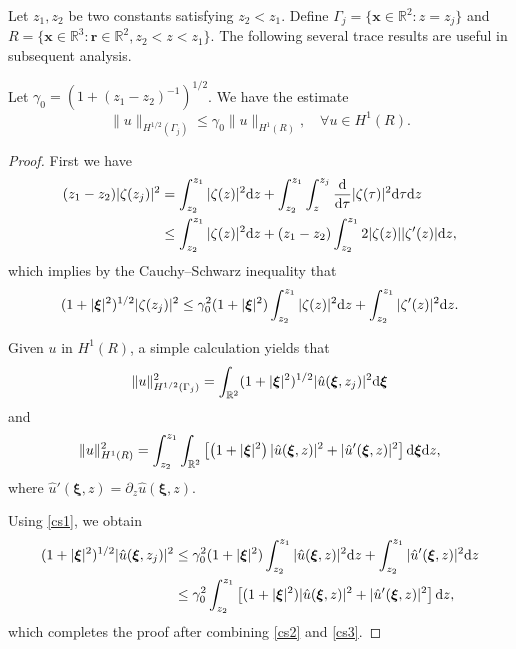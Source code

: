 \documentclass[final,leqno]{siamltex}
\begin{document}
Let $z_1, z_2$ be two constants satisfying $z_2<z_1$. Define
$\Gamma_j=\{\boldsymbol x\in\mathbb R^2: z=z_j\}$ and $R=\{\boldsymbol
x\in\mathbb{R}^3: \boldsymbol r\in\mathbb R^2, z_2<z<z_1\}$. The following
several trace results are useful in subsequent analysis.

\begin{lemma}\label{tr}
Let $\gamma_0=(1+(z_1 -z_2)^{-1})^{1/2}$. We have the estimate
\[
\|u\|_{H^{1/2}(\Gamma_j)}\leq \gamma_0 \| u\|_{H^1(R)},\quad\forall u\in
H^1(R).
\]
\end{lemma}

\begin{proof}
First we have
\begin{align*}
(z_1 -z_2)|\zeta(z_j)|^2&=\int_{z_2}^{z_1}|\zeta(z)|^2
{\rm d}z+\int_{z_2}^{z_1}\int_z^{z_j}\frac{\rm d}{{\rm d}\tau}|\zeta(\tau)|^2
{\rm d}\tau{\rm d}z\\
&\leq\int_{z_2}^{z_1}|\zeta(z)|^2{\rm
d}z+(z_1 -z_2)\int_{z_2}^{z_1}2|\zeta(z)||\zeta'(z)|{\rm d}z,
\end{align*}
which implies by the Cauchy--Schwarz inequality that
\begin{equation}\label{cs1}
(1+|\boldsymbol\xi|^2)^{1/2}|\zeta(z_j)|^2\leq \gamma_0^2
(1+|\boldsymbol\xi|^2)\int_{z_2}^{z_1}|\zeta(z)|^2
{\rm d}z+\int_{z_2}^{z_1}|\zeta'(z)|^2 {\rm d}z.
\end{equation}

Given $u$ in $H^1(R)$, a simple calculation yields that
\begin{equation}\label{cs2}
\|u\|^2_{H^{1/2}(\Gamma_j)}=\int_{\mathbb{R}^2}(1+|\boldsymbol\xi|^2)^{1/2}
|\hat{u} (\boldsymbol\xi, z_j)|^2 {\rm d}\boldsymbol\xi
\end{equation}
and
\begin{equation}\label{cs3}
\|u\|^2_{H^1(R)}=\int_{z_2}^{z_1}\int_{\mathbb{R}^2}\left[
\left(1+|\boldsymbol\xi|^2\right)|\hat{u}(\boldsymbol\xi,
z)|^2+|\hat{u}'(\boldsymbol\xi, z)|^2\right] {\rm d}\boldsymbol\xi {\rm d}z,
\end{equation}
where $\hat{u}'(\boldsymbol\xi, z)=\partial_z \hat{u}(\boldsymbol\xi, z)$.

Using \eqref{cs1}, we obtain
\begin{align*}
(1+|\boldsymbol\xi|^2)^{1/2}|\hat{u}(\boldsymbol\xi, z_j)|^2 &\leq\gamma_0^2
(1+|\boldsymbol\xi|^2)\int_{z_2}^{z_1}|\hat{u}(\boldsymbol\xi, z)|^2
{\rm d}z+\int_{z_2}^{z_1}|\hat{u}'(\boldsymbol\xi, z)|^2 {\rm d}z\\
&\leq\gamma_0^2\int_{z_2}^{z_1}\left[(1+|\boldsymbol\xi|^2)|\hat{u}
(\boldsymbol\xi, z)|^2+|\hat{u}'(\boldsymbol\xi, z)|^2\right]{\rm d}z,
\end{align*}
which completes the proof after combining \eqref{cs2} and \eqref{cs3}.
\end{proof}
\end{document}
